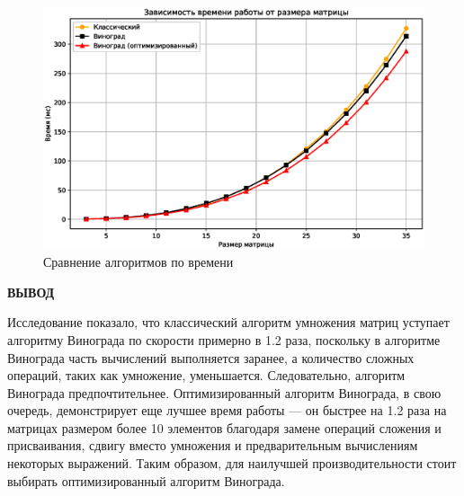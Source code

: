 \begin{figure}[H]
    \centering
    \includegraphics[width=1\linewidth]{img/graph.eps}
    \caption{Сравнение алгоритмов по времени}
    \label{fig:tm}
\end{figure}

\clearpage

\textbf{ВЫВОД}

Исследование показало, что классический алгоритм умножения матриц уступает алгоритму Винограда по скорости примерно в 1.2 раза, поскольку в алгоритме Винограда часть вычислений выполняется заранее, а количество сложных операций, таких как умножение, уменьшается. Следовательно, алгоритм Винограда предпочтительнее. Оптимизированный алгоритм Винограда, в свою очередь, демонстрирует еще лучшее время работы — он быстрее на 1.2 раза на матрицах размером более 10 элементов благодаря замене операций сложения и присваивания, сдвигу вместо умножения и предварительным вычислениям некоторых выражений. Таким образом, для наилучшей производительности стоит выбирать оптимизированный алгоритм Винограда.